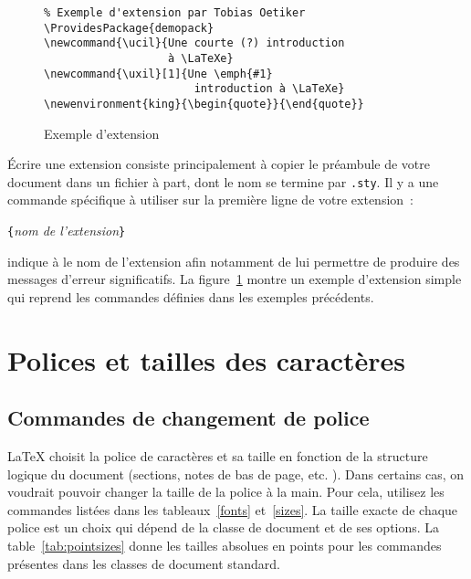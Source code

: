 \begin{figure}[!htbp]
\begin{lined}{\textwidth}
\begin{verbatim}
% Exemple d'extension par Tobias Oetiker
\ProvidesPackage{demopack}
\newcommand{\ucil}{Une courte (?) introduction
                   à \LaTeXe}
\newcommand{\uxil}[1]{Une \emph{#1}  
                       introduction à \LaTeXe}
\newenvironment{king}{\begin{quote}}{\end{quote}}
\end{verbatim}
\end{lined}
\caption{Exemple d'extension} \label{package}
\end{figure}

Écrire une extension consiste principalement à copier le préambule de
votre document dans un fichier à part, dont le nom se termine par
\texttt{.sty}. Il y a une commande spécifique à utiliser sur la
première ligne de votre extension~:

\begin{lscommand}
\verb|{|\emph{nom de l'extension}\verb|}|
\end{lscommand}

\noindent  {} indique à \LaTeXe{} le nom de
l'extension afin notamment de lui permettre de produire des messages
d'erreur significatifs. La figure~\ref{package} montre un exemple
d'extension simple qui reprend les commandes définies dans les
exemples précédents. 

\section{Polices et tailles des caractères}
\label{sec:fontsize}

\subsection{Commandes de changement de police}
\LaTeX{} choisit la police de caractères et sa taille en fonction de la
structure logique du document (sections, notes de bas de
page, etc. ). Dans certains cas, on voudrait pouvoir changer la taille
de la police à la main. Pour cela, utilisez les commandes listées dans
les tableaux~\ref{fonts} et~\ref{sizes}. La taille exacte de chaque
police est un choix qui dépend de la classe de document et de ses
options. La table~\ref{tab:pointsizes} donne les tailles absolues en
points pour les commandes présentes dans les classes de document
standard. 

